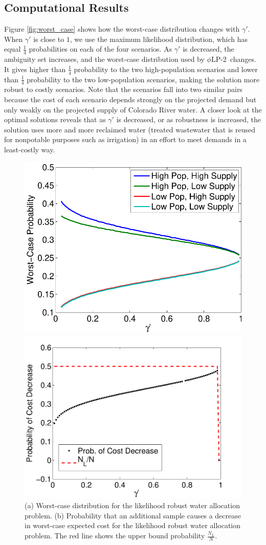 \documentclass[ijoc,nonblindrev]{informs3} %
\newcommand{\plp}{$\phi$LP-2}
\begin{document}
\subsection{Computational Results}

Figure \ref{fig:worst_case} shows how the worst-case distribution changes with $\gamma'$.
When $\gamma'$ is close to $1$, we use the maximum likelihood distribution, which has equal $\tfrac{1}{4}$ probabilities on each of the four scenarios.
As $\gamma'$ is decreased, the ambiguity set increases, and the worst-case distribution used by \plp\ changes.
It gives higher than $\tfrac{1}{4}$ probability to the two high-population scenarios and lower than $\tfrac{1}{4}$ probability to the two low-population scenarios, making the solution more robust to costly scenarios.
Note that the scenarios fall into two similar pairs because the cost of each scenario depends strongly on the projected demand but only weakly on the projected supply of Colorado River water.
A closer look at the optimal solutions reveals that as $\gamma'$ is decreased, or as robustness is increased, the solution uses more and more reclaimed water (treated wastewater that is reused for nonpotable purposes such as irrigation) in an effort to meet demands in a least-costly way.

\begin{figure}
	\FIGURE
	{%
		\includegraphics*[width=.5\textwidth]{images/worst_case_probability}%
		\includegraphics*[width=.5\textwidth]{images/water_prob_decrease}%
	}
	{
		(a) Worst-case distribution for the likelihood robust water allocation problem.
		(b) Probability that an additional sample causes a decrease in worst-case expected cost for the likelihood robust water allocation problem.
		The red line shows the upper bound probability $\tfrac{N_L}{N}$.
		\label{fig:worst_case}
		\label{fig:water_prob_decrease}
	}
	{}
\end{figure}
\end{document}
